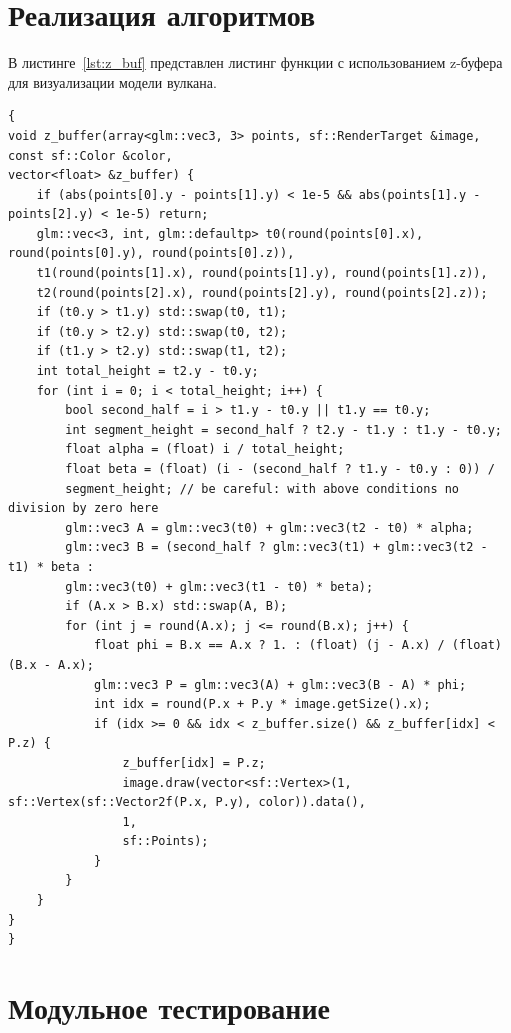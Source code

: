 \section{Реализация алгоритмов}

В листинге~\ref{lst:z_buf} представлен листинг функции с использованием z-буфера для визуализации модели вулкана. 
\newpage
\begin{lstlisting}[style=C, caption={},label={lst:z_buf}]
{
void z_buffer(array<glm::vec3, 3> points, sf::RenderTarget &image, const sf::Color &color,
vector<float> &z_buffer) {
	if (abs(points[0].y - points[1].y) < 1e-5 && abs(points[1].y - points[2].y) < 1e-5) return;
	glm::vec<3, int, glm::defaultp> t0(round(points[0].x), round(points[0].y), round(points[0].z)),
	t1(round(points[1].x), round(points[1].y), round(points[1].z)),
	t2(round(points[2].x), round(points[2].y), round(points[2].z));
	if (t0.y > t1.y) std::swap(t0, t1);
	if (t0.y > t2.y) std::swap(t0, t2);
	if (t1.y > t2.y) std::swap(t1, t2);
	int total_height = t2.y - t0.y;
	for (int i = 0; i < total_height; i++) {
		bool second_half = i > t1.y - t0.y || t1.y == t0.y;
		int segment_height = second_half ? t2.y - t1.y : t1.y - t0.y;
		float alpha = (float) i / total_height;
		float beta = (float) (i - (second_half ? t1.y - t0.y : 0)) /
		segment_height; // be careful: with above conditions no division by zero here
		glm::vec3 A = glm::vec3(t0) + glm::vec3(t2 - t0) * alpha;
		glm::vec3 B = (second_half ? glm::vec3(t1) + glm::vec3(t2 - t1) * beta :
		glm::vec3(t0) + glm::vec3(t1 - t0) * beta);
		if (A.x > B.x) std::swap(A, B);
		for (int j = round(A.x); j <= round(B.x); j++) {
			float phi = B.x == A.x ? 1. : (float) (j - A.x) / (float) (B.x - A.x);
			glm::vec3 P = glm::vec3(A) + glm::vec3(B - A) * phi;
			int idx = round(P.x + P.y * image.getSize().x);
			if (idx >= 0 && idx < z_buffer.size() && z_buffer[idx] < P.z) {
				z_buffer[idx] = P.z;
				image.draw(vector<sf::Vertex>(1, sf::Vertex(sf::Vector2f(P.x, P.y), color)).data(),
				1,
				sf::Points);
			}
		}
	}
}
}
\end{lstlisting}

\section{Модульное тестирование}

